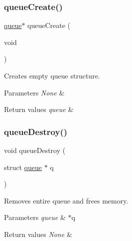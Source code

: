 \subsubsection{\texorpdfstring{queue\+Create()}{queueCreate()}}
{\footnotesize\ttfamily \hyperlink{structqueue}{queue}$\ast$ queue\+Create (\begin{DoxyParamCaption}\item[{void}]{ }\end{DoxyParamCaption})}



Creates empty queue structure. 


\begin{DoxyParams}{Parameters}
{\em None} & \\
\hline
\end{DoxyParams}

\begin{DoxyRetVals}{Return values}
{\em queue} & \\
\hline
\end{DoxyRetVals}
\mbox{\label{group___queue___structure_gaf0183bb74c502f839f05ccb60e90496f}} 
\subsubsection{\texorpdfstring{queue\+Destroy()}{queueDestroy()}}
{\footnotesize\ttfamily void queue\+Destroy (\begin{DoxyParamCaption}\item[{struct \hyperlink{structqueue}{queue} $\ast$}]{q }\end{DoxyParamCaption})}



Removes entire queue and frees memory. 


\begin{DoxyParams}{Parameters}
{\em queue} & $\ast$q \\
\hline
\end{DoxyParams}

\begin{DoxyRetVals}{Return values}
{\em None} & \\
\hline
\end{DoxyRetVals}
\mbox{\label{group___queue___structure_gaceddff2dc3ce07ad02a362bee362afb8}} 
